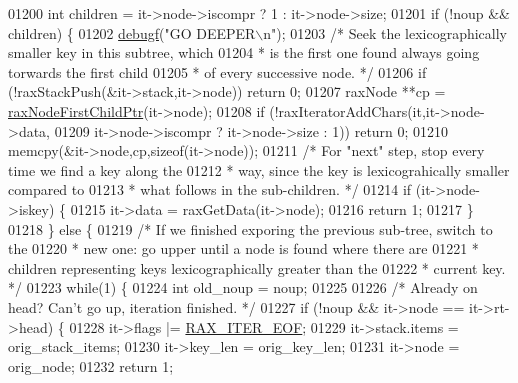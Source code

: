 \begin{DoxyCode}
{{{{{{{{{{{{{{{{{{01200         \textcolor{keywordtype}{int} children = it->node->iscompr ? 1 : it->node->size;
01201         \textcolor{keywordflow}{if} (!noup && children) \{
01202             \hyperlink{rax_8c_a10b215c81aa397dbc44adfb3e436befb}{debugf}(\textcolor{stringliteral}{"GO DEEPER\(\backslash\)n"});
01203             \textcolor{comment}{/* Seek the lexicographically smaller key in this subtree, which}
01204 \textcolor{comment}{             * is the first one found always going torwards the first child}
01205 \textcolor{comment}{             * of every successive node. */}
01206             \textcolor{keywordflow}{if} (!raxStackPush(&it->stack,it->node)) \textcolor{keywordflow}{return} 0;
01207             raxNode **cp = \hyperlink{rax_8c_aa94163a0d02b30219ef18e5a3ea06ca6}{raxNodeFirstChildPtr}(it->node);
01208             \textcolor{keywordflow}{if} (!raxIteratorAddChars(it,it->node->data,
01209                 it->node->iscompr ? it->node->size : 1)) \textcolor{keywordflow}{return} 0;
01210             memcpy(&it->node,cp,\textcolor{keyword}{sizeof}(it->node));
01211             \textcolor{comment}{/* For "next" step, stop every time we find a key along the}
01212 \textcolor{comment}{             * way, since the key is lexicograhically smaller compared to}
01213 \textcolor{comment}{             * what follows in the sub-children. */}
01214             \textcolor{keywordflow}{if} (it->node->iskey) \{
01215                 it->data = raxGetData(it->node);
01216                 \textcolor{keywordflow}{return} 1;
01217             \}
01218         \} \textcolor{keywordflow}{else} \{
01219             \textcolor{comment}{/* If we finished exporing the previous sub-tree, switch to the}
01220 \textcolor{comment}{             * new one: go upper until a node is found where there are}
01221 \textcolor{comment}{             * children representing keys lexicographically greater than the}
01222 \textcolor{comment}{             * current key. */}
01223             \textcolor{keywordflow}{while}(1) \{
01224                 \textcolor{keywordtype}{int} old\_noup = noup;
01225 
01226                 \textcolor{comment}{/* Already on head? Can't go up, iteration finished. */}
01227                 \textcolor{keywordflow}{if} (!noup && it->node == it->rt->head) \{
01228                     it->flags |= \hyperlink{rax_8h_a4fb08a914b84ba0a39daa86297176e1c}{RAX\_ITER\_EOF};
01229                     it->stack.items = orig\_stack\_items;
01230                     it->key\_len = orig\_key\_len;
01231                     it->node = orig\_node;
01232                     \textcolor{keywordflow}{return} 1;
}}}}}}}}}}}}}}}}}}
\end{DoxyCode}
